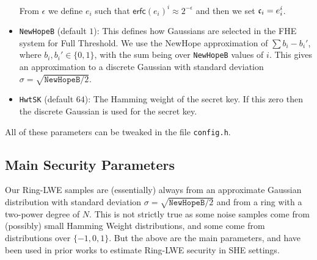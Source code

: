\begin{itemize}
        From $\epsilon$ we define $e_i$ such that
        $\mathsf{erfc}(e_i)^i \approx 2^{-\epsilon}$ and then we set $\mathfrak{c}_i = e_i^i$.
  \item \verb+NewHopeB+ (default $1$):
        This defines how Gaussians are selected in the FHE system for
        Full Threshold. We use the NewHope approximation of
        $\sum b_i - b_i'$, where $b_i, b_i' \in \{0,1\}$,
        with the sum being over \verb+NewHopeB+ values of $i$.
        This gives an approximation to a discrete Gaussian with
        standard deviation $\sigma = \sqrt{\texttt{NewHopeB}/2}$.
  \item \verb+HwtSK+ (default $64$):
        The Hamming weight of the secret key. If this zero
        then the discrete Gaussian is used for the secret key.
\end{itemize}
All of these parameters can be tweaked in the file
\verb+config.h+.

\subsection{Main Security Parameters}
Our Ring-LWE samples are (essentially) always from an
approximate Gaussian distribution with standard deviation
$\sigma=\sqrt{\texttt{NewHopeB}/2}$
and from a ring with a two-power degree of $N$.
This is not strictly true as some noise samples come
from (possibly) small Hamming Weight distributions, and some come
from distributions over $\{-1,0,1\}$.
But the above are the main parameters, and have been used in prior works to
estimate Ring-LWE security in SHE settings.

